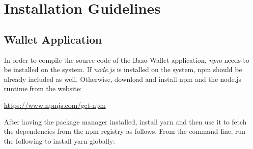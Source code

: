 \appendix
\chapter{Installation Guidelines}
\section{Wallet Application}

In order to compile the source code of the Bazo Wallet application, \textit{npm} needs to be installed on the system. If \textit{node.js} is installed on the system, npm should be already included as well. Otherwise, download and install npm and the node.js runtime from the website:

\begin{framed}
\url{https://www.npmjs.com/get-npm}
\end{framed}

After having the package manager installed, install yarn and then use it to fetch the dependencies from the npm registry as follows. From the command line, run the following to install yarn globally:

